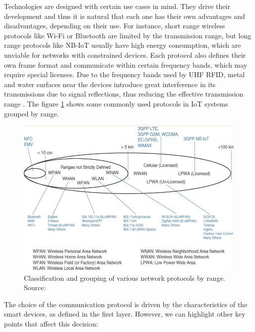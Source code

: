 Technologies are designed with certain use cases in mind. They drive their development and thus it is natural that each one has their own advantages and disadvantages, depending on their use. For instance, short range wireless protocols like Wi-Fi or Bluetooth are limited by the transmission range, but long range protocols like NB-IoT usually have high energy consumption, which are unviable for networks with constrained devices. Each protocol also defines their own frame format and communicate within certain frequency bands, which may require special licenses. Due to the frequency bands used by UHF \acs{RFID}, metal and water surfaces near the devices introduce great interference in its transmissions due to signal reflections, thus reducing the effective transmission range \cite{Cairo2018}. The figure \ref{fig:communication-protocols} shows some commonly used protocols in \acs{IoT} systems grouped by range. 

\begin{figure}[H]
    \centering
    \includegraphics[width=0.85\linewidth]{images/communication-protocols.png}
    \caption[Classification and grouping of various network protocols by range.]{ Classification and grouping of various network protocols by range. Source: \cite{10.5555/3161403}}
    \label{fig:communication-protocols}
\end{figure}


The choice of the communication protocol is driven by the characteristics of the smart devices, as defined in the first layer. However, we can highlight other key points that affect this decision:

